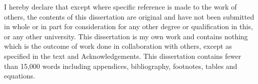 
\begin{declaration}

I hereby declare that except where specific reference is made to the work of 
others, the contents of this dissertation are original and have not been 
submitted in whole or in part for consideration for any other degree or 
qualification in this, or any other university. This dissertation is my own 
work and contains nothing which is the outcome of work done in collaboration 
with others, except as specified in the text and Acknowledgements. This 
dissertation contains fewer than 15,000 words including appendices, 
bibliography, footnotes, tables and equations.


\end{declaration}